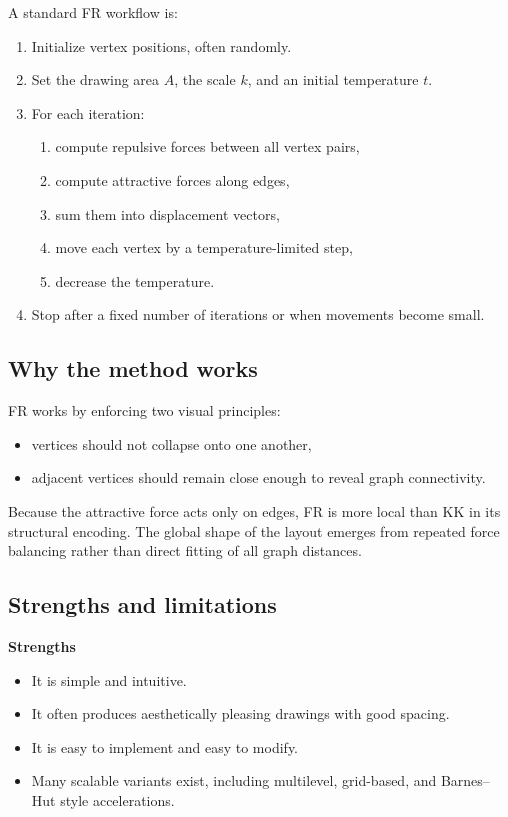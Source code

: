 \documentclass[11pt]{article}
\begin{document}
A standard FR workflow is:
\begin{enumerate}[leftmargin=1.5em]
\item Initialize vertex positions, often randomly.
\item Set the drawing area $A$, the scale $k$, and an initial temperature $t$.
\item For each iteration:
  \begin{enumerate}[leftmargin=1.5em]
  \item compute repulsive forces between all vertex pairs,
  \item compute attractive forces along edges,
  \item sum them into displacement vectors,
  \item move each vertex by a temperature-limited step,
  \item decrease the temperature.
  \end{enumerate}
\item Stop after a fixed number of iterations or when movements become small.
\end{enumerate}

\subsection{Why the method works}

FR works by enforcing two visual principles:
\begin{itemize}[leftmargin=1.5em]
\item vertices should not collapse onto one another,
\item adjacent vertices should remain close enough to reveal graph connectivity.
\end{itemize}

Because the attractive force acts only on edges, FR is more local than KK in
its structural encoding. The global shape of the layout emerges from repeated
force balancing rather than direct fitting of all graph distances.

\subsection{Strengths and limitations}

\textbf{Strengths}
\begin{itemize}[leftmargin=1.5em]
\item It is simple and intuitive.
\item It often produces aesthetically pleasing drawings with good spacing.
\item It is easy to implement and easy to modify.
\item Many scalable variants exist, including multilevel, grid-based, and
Barnes--Hut style accelerations.
\end{itemize}
\end{document}
